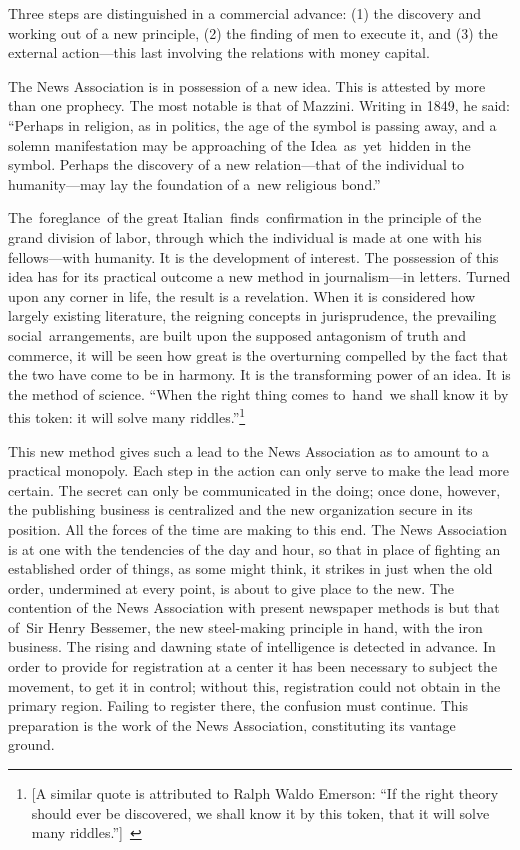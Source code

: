 \documentclass[openany,nobib]{tufte-book}
\begin{document}
Three steps are distinguished in a commercial advance: (1) the discovery
and working out of a new principle, (2) the finding of men to execute
it, and (3) the external action---this last involving the relations with
money capital.~

The News Association is in possession of a new idea. This is attested by
more than one prophecy. The most notable is that of Mazzini. Writing in
1849, he said: ``Perhaps in religion, as in politics, the age of the
symbol is passing away, and a solemn manifestation may be approaching of
the Idea~as~yet~hidden in the symbol. Perhaps the discovery of a new
relation---that of the individual to humanity---may lay the foundation
of a~new religious bond.''

The~foreglance~of the great Italian~finds~confirmation in the principle
of the grand division of labor, through which the individual is made at
one with his fellows---with humanity. It is the development of interest.
The possession of this idea has for its practical outcome a new method
in journalism---in letters. Turned upon any corner in life, the result
is a revelation. When it is considered how largely existing literature,
the reigning concepts in jurisprudence, the prevailing
social~arrangements, are built upon the supposed antagonism of truth and
commerce, it will be seen how great is the overturning compelled by the
fact that the two have come to be in harmony. It is the transforming
power of an idea. It is the method of science. ``When the right thing
comes to~hand~we shall know it by this token: it will solve many
riddles.''\footnote{{[}A similar quote is attributed to Ralph Waldo
  Emerson: ``If the right theory should ever be discovered, we shall
  know it by this token, that it will solve many
  riddles.''\href{applewebdata://D02306DF-3E46-4684-BD1A-1A323FFB2CB2\#_msocom_1}{{]}}~}~

This new method gives such a lead to the News Association as to amount
to a practical monopoly. Each step in the action can only serve to make
the lead more certain. The secret can only be communicated in the doing;
once done, however, the publishing business is centralized and the new
organization secure in its position. All the forces of the time are
making to this end. The News Association is at one with the tendencies
of the day and hour, so that in place of fighting an established order
of things, as some might think, it strikes in just when the old order,
undermined at every point, is about to give place to the new. The
contention of the News Association with present newspaper methods is but
that of~Sir Henry Bessemer, the new steel-making principle in hand, with
the iron business. The rising and dawning state of intelligence is
detected in advance. In order to provide for registration at a center it
has been necessary to subject the movement, to get it in control;
without this, registration could not obtain in the primary region.
Failing to register there, the confusion must continue. This preparation
is the work of the News Association, constituting its vantage ground.~
\end{document}
